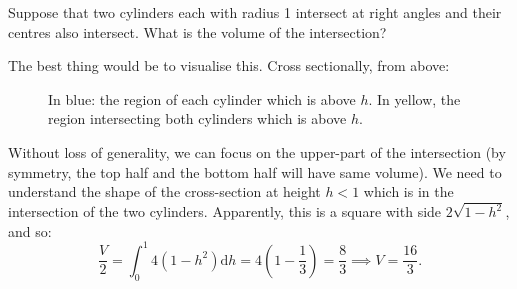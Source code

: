 \begin{qanda} %
    \Q Suppose that two cylinders each with radius 1 intersect at right angles and their centres also intersect. What is the volume of the intersection?

    \A The best thing would be to visualise this. Cross sectionally, from above: 
    
    \begin{figure}[h]
        \centering
        \caption{In blue: the region of each cylinder which is above $h$. In yellow, the region intersecting both cylinders which is above $h$. }
        \label{fig:}
    \end{figure}

    Without loss of generality, we can focus on the upper-part of the intersection (by symmetry, the top half and the bottom half will have same volume).
    We need to understand the shape of the cross-section at height $h<1$ which is in the intersection of the two cylinders.
    Apparently, this is a square with side $2 \sqrt{1-h^2}$, and so:
    \[
    \frac{V}{2} =
    \int_0^1  4(1 - h^2) \mathrm{d}h = 4 \left(  1 - \frac{1}{3} \right) = \frac{8}{3} 
    \implies
V = \frac{16}{3}.
    \]
\end{qanda}

